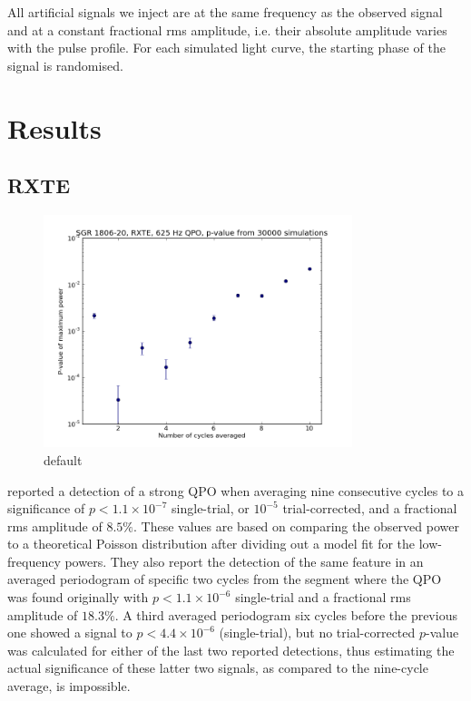 \documentclass{emulateapj}
\begin{document}
All artificial signals we inject are at the same frequency as the observed signal and at a constant fractional rms amplitude, i.e. their absolute amplitude varies with the pulse profile. For each simulated light curve, the starting phase of the signal is randomised. 

\section{Results}
\label{sec:results}

\subsection{RXTE}
\label{sec:rxte_results}

\begin{figure}[htbp]
\begin{center}
\includegraphics[width=9cm]{1806_rxte_pvals.png}
\caption{default}
\label{fig:rxte_pvals}
\end{center}
\end{figure}

\citealt{Strohmayer06} reported a detection of a strong QPO when averaging nine consecutive cycles to a significance of $p < 1.1 \times 10^{-7}$ single-trial, or $10^{-5}$ trial-corrected, and a fractional rms amplitude of $8.5\%$. These values are based on comparing the observed power to a theoretical Poisson distribution after dividing out a model fit for the low-frequency powers. They also report the detection of the same feature in an averaged periodogram of specific two cycles from the segment where the QPO was found originally with $p < 1.1 \times 10^{-6}$ single-trial and a fractional rms amplitude of $18.3\%$. A third averaged periodogram six cycles before the previous one showed a signal to $p < 4.4 \times 10^{-6}$ (single-trial), but no trial-corrected $p$-value was calculated for either of the last two reported detections, thus estimating the actual significance of these latter two signals, as compared to the nine-cycle average, is impossible.
\end{document}
